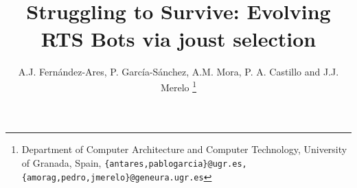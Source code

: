 \documentclass[conference]{IEEEtran}
\begin{document}


\title{\ \\ \LARGE\bf Struggling to Survive: Evolving RTS Bots via
  joust selection}





\author{A.J. Fern\'andez-Ares, P. Garc\'ia-S\'anchez, A.M. Mora, P. A. Castillo and J.J. Merelo \thanks{Department of Computer Architecture and Computer Technology, University of Granada, Spain, {\tt \{antares,pablogarcia\}@ugr.es, \{amorag,pedro,jmerelo\}@geneura.ugr.es}}}

\maketitle
\end{document}
